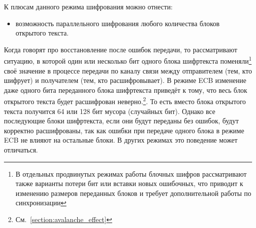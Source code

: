 

К плюсам данного режима шифрования можно отнести:

\begin{itemize}
	\item возможность параллельного шифрования любого количества блоков открытого текста.
\end{itemize}

Когда говорят про восстановление после ошибок передачи, то рассматривают ситуацию, в которой один или несколько бит одного блока шифртекста поменяли\footnote{В отдельных продвинутых режимах работы блочных шифров рассматривают также варианты потери бит или вставки новых ошибочных, что приводит к изменению размеров переданных блоков и требует дополнительной работы по синхронизации} своё значение в процессе передачи по каналу связи между отправителем (тем, кто шифрует) и получателем (тем, кто расшифровывает). В режиме ECB изменение даже одного бита переданного блока шифртекста приведёт к тому, что весь блок открытого текста будет расшифрован неверно.\footnote{См.~\autoref{section:avalanche_effect}}. То есть вместо блока открытого текста получится 64 или 128 бит мусора (случайных бит). Однако все последующие блоки шифртекста, если они будут переданы без ошибок, будут корректно расшифрованы, так как ошибки при передаче одного блока в режиме ECB не влияют на остальные блоки. В других режимах это поведение может отличаться.

